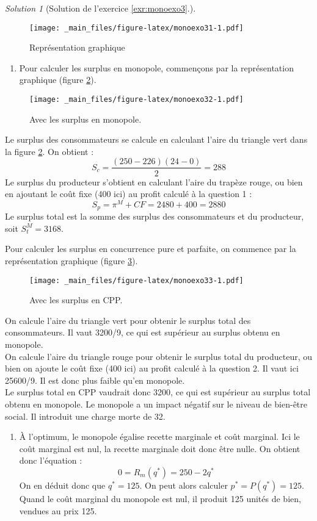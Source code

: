\documentclass[
]{book}
\providecommand{\tightlist}{%
  \setlength{\itemsep}{0pt}\setlength{\parskip}{0pt}}
\theoremstyle{definition}
\theoremstyle{definition}
\theoremstyle{definition}
\theoremstyle{definition}
\theoremstyle{remark}
\newtheorem*{solution}{Solution}
\begin{document}
\begin{solution}[Solution de l'exercice  \ref{exr:monoexo3}.]
\begin{figure}
\centering
\texttt{[image: \_main\_files/figure-latex/monoexo31-1.pdf]}
\caption{\label{fig:monoexo31}Représentation graphique}
\end{figure}

\begin{enumerate}
\def\labelenumi{\arabic{enumi}.}
\setcounter{enumi}{2}
\tightlist
\item
  Pour calculer les surplus en monopole, commençons par la représentation graphique (figure \ref{fig:monoexo32}).
\end{enumerate}

\begin{figure}
\centering
\texttt{[image: \_main\_files/figure-latex/monoexo32-1.pdf]}
\caption{\label{fig:monoexo32}Avec les surplus en monopole.}
\end{figure}

Le surplus des consommateurs se calcule en calculant l'aire du triangle vert dans la figure \ref{fig:monoexo32}.
On obtient :
\[S_c=\frac{(250-226)(24-0)}{2}=288\]
Le surplus du producteur s'obtient en calculant l'aire du trapèze rouge, ou bien en ajoutant le coût fixe (400 ici) au profit calculé à la question 1 :
\[S_p=\pi^M+CF=2480+400=2880\]
Le surplus total est la somme des surplus des consommateurs et du producteur, soit \(S_t^M=3168\).

Pour calculer les surplus en concurrence pure et parfaite, on commence par la représentation graphique (figure \ref{fig:monoexo33}).

\begin{figure}
\centering
\texttt{[image: \_main\_files/figure-latex/monoexo33-1.pdf]}
\caption{\label{fig:monoexo33}Avec les surplus en CPP.}
\end{figure}

On calcule l'aire du triangle vert pour obtenir le surplus total des consommateurs.
Il vaut 3200/9, ce qui est supérieur au surplus obtenu en monopole.\\
On calcule l'aire du triangle rouge pour obtenir le surplus total du producteur, ou bien on ajoute le coût fixe (400 ici) au profit calculé à la question 2.
Il vaut ici 25600/9.
Il est donc plus faible qu'en monopole.\\
Le surplus total en CPP vaudrait donc 3200, ce qui est supérieur au surplus total obtenu en monopole.
Le monopole a un impact négatif sur le niveau de bien-être social.
Il introduit une charge morte de 32.

\begin{enumerate}
\def\labelenumi{\arabic{enumi}.}
\setcounter{enumi}{3}
\tightlist
\item
  À l'optimum, le monopole égalise recette marginale et coût marginal.
  Ici le coût marginal est nul, la recette marginale doit donc être nulle.
  On obtient donc l'équation :
  \[
  0=R_m(q^*)=250-2q^*
  \]
  On en déduit donc que \(q^*=125\).
  On peut alors calculer \(p^*=P(q^*)=125\).
  Quand le coût marginal du monopole est nul, il produit 125 unités de bien, vendues au prix 125.
\end{enumerate}

\end{solution}

  
\end{document}
